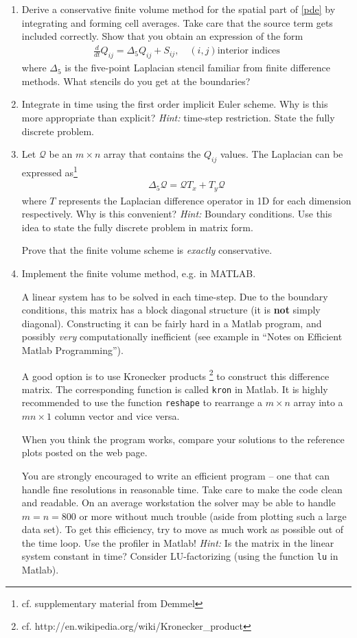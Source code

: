 \documentclass[11pt, a4paper]{article}
\newcommand{\Q}{\mathcal{Q}}
\begin{document}
\begin{enumerate}
\item Derive a conservative finite volume method for the spatial part
  of \eqref{pde} by integrating and forming cell averages. Take care
  that the source term gets included correctly. Show that you obtain
  an expression of the form
  \begin{align*}
    \frac{d}{dt} Q_{ij} = \Delta_5 Q_{ij} + S_{ij}, \quad (i,j) \text{
      interior indices}
  \end{align*}
  where $\Delta_5$ is the five-point Laplacian stencil familiar from
  finite difference methods. What stencils do you get at the
  boundaries? 
\item Integrate in time using the first order implicit Euler
  scheme. Why is this more appropriate than explicit? \emph{Hint:}
  time-step restriction. State the fully discrete problem.
\item Let $\Q$ be an $m\times n$ array that contains the $Q_{ij}$
  values. The Laplacian can be expressed as\footnote{cf. supplementary
    material from Demmel}
  \begin{align*}
    \Delta_5\Q = \Q T_x + T_y \Q 
  \end{align*}
  where $T$ represents the Laplacian difference operator in 1D for
  each dimension respectively. Why is this convenient? \emph{Hint:}
  Boundary conditions. Use this idea to state the fully discrete
  problem in matrix form. 

  Prove that the finite volume scheme is \emph{exactly} conservative.
\item Implement the finite volume method, e.g. in MATLAB. 

  A linear system has to be solved in each time-step. Due to the
  boundary conditions, this matrix has a block diagonal structure (it
  is {\bf not} simply diagonal). Constructing it can be fairly hard in
  a Matlab program, and possibly \emph{very} computationally
  inefficient (see example in ``Notes on Efficient Matlab
  Programming'').

  A good option is to use Kronecker products
  \footnote{cf. http://en.wikipedia.org/wiki/Kronecker\_product } to
  construct this difference matrix. The corresponding function is
  called \verb|kron| in Matlab. It is highly recommended to use the
  function \verb|reshape| to rearrange a $m\times n$ array into a
  $mn\times 1$ column vector and vice versa.

  When you think the program works, compare your solutions to the
  reference plots posted on the web page.

  You are strongly encouraged to write an efficient program -- one that
  can handle fine resolutions in reasonable time. Take care to make
  the code clean and readable. On an average workstation the solver
  may be able to handle $m = n = 800$ or more without much trouble
  (aside from plotting such a large data set). To get this efficiency,
  try to move as much work as possible out of the time loop. Use the
  profiler in Matlab! \emph{Hint:} Is the matrix in the linear system
  constant in time? Consider LU-factorizing (using the function
  \verb|lu| in Matlab).
\end{enumerate}
\end{document}
